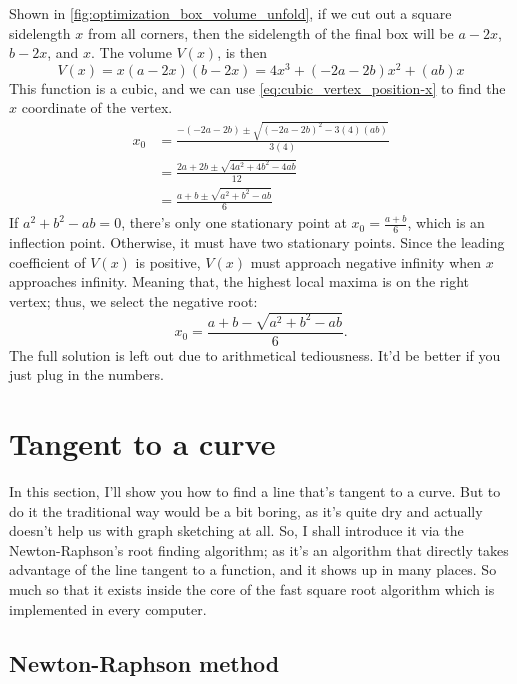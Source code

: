 Shown in \cref{fig:optimization_box_volume_unfold}, if we cut out a square sidelength $x$ from all corners, then the sidelength of the final box will be $a - 2x$, $b - 2x$, and $x$. The volume $V(x)$, is then
\begin{equation}
	V(x) = x(a - 2x)(b - 2x) = 4x^3 + (- 2a - 2b)x^2 + (ab)x
\end{equation}
This function is a cubic, and we can use \cref{eq:cubic_vertex_position-x} to find the $x$ coordinate of the vertex.
\begin{align}
	x_0 & = \frac{- (- 2a - 2b) \pm \sqrt{(- 2a - 2b)^2 - 3(4)(ab)}}{3(4)} \\
	    & = \frac{2a + 2b \pm \sqrt{4a^2 + 4b^2 - 4ab}}{12}                \\
	    & = \frac{a + b \pm \sqrt{a^2 + b^2 - ab}}{6}
\end{align}
If $a^2 + b^2 - ab = 0$, there's only one stationary point at $x_0 = \frac{a + b}{6}$, which is an inflection point. Otherwise, it must have two stationary points. Since the leading coefficient of $V(x)$ is positive, $V(x)$ must approach negative infinity when $x$ approaches infinity. Meaning that, the highest local maxima is on the right vertex; thus, we select the negative root:
\begin{equation}
	x_0 = \frac{a + b - \sqrt{a^2 + b^2 - ab}}{6}.
\end{equation}
The full solution is left out due to arithmetical tediousness. It'd be better if you just plug in the numbers.

\section{Tangent to a curve}

In this section, I'll show you how to find a line that's tangent to a curve. But to do it the traditional way would be a bit boring, as it's quite dry and actually doesn't help us with graph sketching at all. So, I shall introduce it via the Newton-Raphson's root finding algorithm; as it's an algorithm that directly takes advantage of the line tangent to a function, and it shows up in many places. So much so that it exists inside the core of the fast square root algorithm which is implemented in every computer.

\subsection{Newton-Raphson method}

